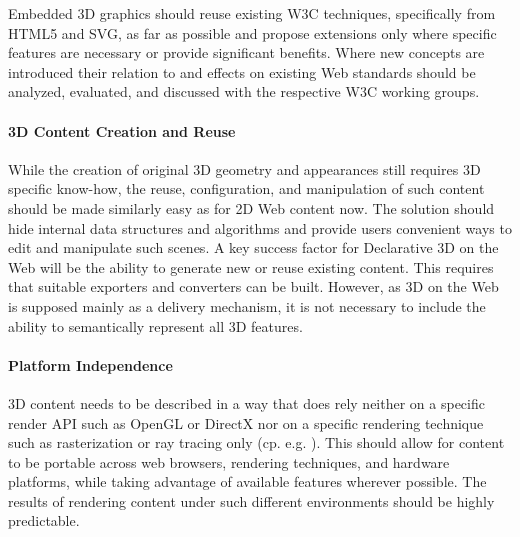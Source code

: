 \documentclass{acmsiggraph}
\begin{document}
Embedded 3D graphics should reuse existing W3C techniques, specifically from HTML5 and SVG, as far as possible and propose extensions only where specific features are necessary or provide significant benefits. Where new concepts are introduced their relation to and effects on existing Web standards should be analyzed, evaluated, and discussed with the respective W3C working groups.

\paragraph{3D Content Creation and Reuse}
While the creation of original 3D geometry and appearances still requires 3D specific know-how, the reuse, configuration, and manipulation of such content should be made similarly easy as for 2D Web content now. The solution should hide internal data structures and algorithms and provide users convenient ways to edit and manipulate such scenes.
A key success factor for Declarative 3D on the Web will be the ability to generate new or reuse existing content. This requires that suitable exporters and converters can be built. However, as 3D on the Web is supposed mainly as a delivery mechanism, it is not necessary to include the ability to semantically represent all 3D features.

\paragraph{Platform Independence}
3D content needs to be described in a way that does rely neither on a specific render API such as OpenGL or DirectX nor on a specific rendering technique such as rasterization or ray tracing only (cp. e.g. \cite{Rubinstein:2009,Schwenk12}). This should allow for content to be portable across web browsers, rendering techniques, and hardware platforms, while taking advantage of available features wherever possible. The results of rendering content under such different environments should be highly predictable.
\end{document}
